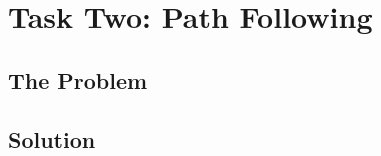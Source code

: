 \chapter{Task Two: Path Following}
\label{task2}

\ifpdf
    \graphicspath{{Chapter4/Figs/Raster/}{Chapter4/Figs/PDF/}{Chapter4/Figs/}}
\else
    \graphicspath{{Chapter4/Figs/Vector/}{Chapter4/Figs/}}
\fi

\section{The Problem}
\label{task2:description}


\section{Solution}
\label{task2:solution}